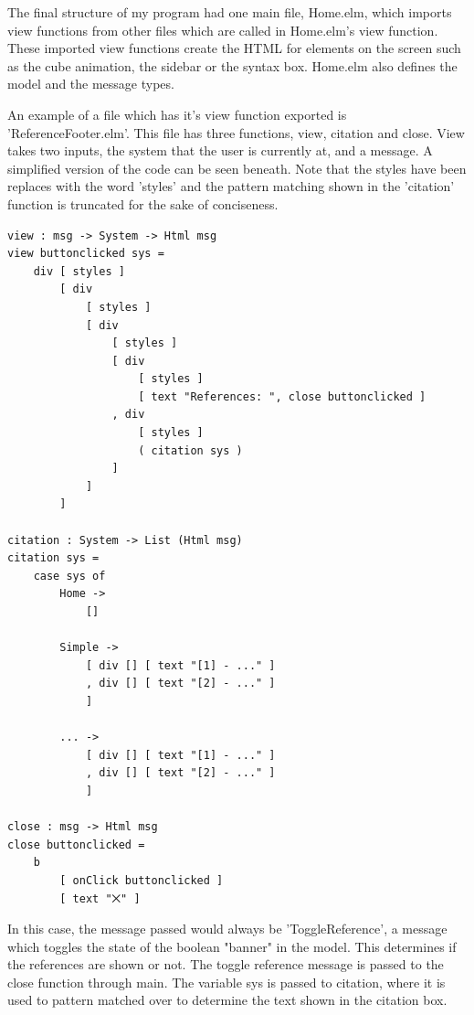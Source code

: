 \documentclass{l4proj}
\begin{document}
The final structure of my program had one main file, Home.elm, which imports view functions from other files which are called in Home.elm's view function.  These imported view functions create the HTML for elements on the screen such as the cube animation, the sidebar or the syntax box.  Home.elm also defines the model and the message types.

An example of a file which has it's view function exported is 'ReferenceFooter.elm'.  This file has three functions, view, citation and close.  View takes two inputs, the system that the user is currently at, and a message.  A simplified version of the code can be seen beneath.  Note that the styles have been replaces with the word 'styles' and the pattern matching shown in the 'citation' function is truncated for the sake of conciseness.

\begin{lstlisting} 
view : msg -> System -> Html msg
view buttonclicked sys =
    div [ styles ]
        [ div
            [ styles ]
            [ div 
                [ styles ]
                [ div
                    [ styles ]
                    [ text "References: ", close buttonclicked ]
                , div
                    [ styles ]
                    ( citation sys )
                ]
            ]
        ]

citation : System -> List (Html msg)
citation sys =
    case sys of
        Home ->
            []

        Simple ->
            [ div [] [ text "[1] - ..." ]
            , div [] [ text "[2] - ..." ]
            ]

        ... ->
            [ div [] [ text "[1] - ..." ]
            , div [] [ text "[2] - ..." ]
            ]
        
close : msg -> Html msg
close buttonclicked =
    b
        [ onClick buttonclicked ]
        [ text "⨉" ]
\end{lstlisting}

In this case, the message passed would always be 'ToggleReference', a message which toggles the state of the boolean "banner" in the model.  This determines if the references are shown or not.  The toggle reference message is passed to the close function through main.  The variable sys is passed to citation, where it is used to pattern matched over to determine the text shown in the citation box.
\end{document}
